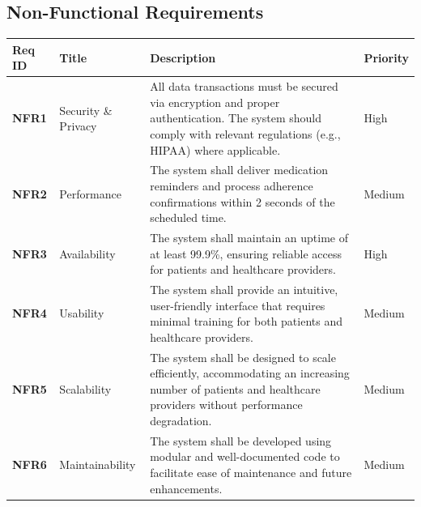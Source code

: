 \documentclass[
  12pt,
]{article}
\begin{document}
\subsection{Non-Functional
Requirements}\label{non-functional-requirements}

\begin{longtable}[]{@{}
  >{\raggedright\arraybackslash}p{}
  >{\raggedright\arraybackslash}p{}
  >{\raggedright\arraybackslash}p{}
  >{\raggedright\arraybackslash}p{}@{}}
\toprule\noalign{}
\begin{minipage}[b]{\linewidth}\raggedright
\textbf{Req ID}
\end{minipage} & \begin{minipage}[b]{\linewidth}\raggedright
\textbf{Title}
\end{minipage} & \begin{minipage}[b]{\linewidth}\raggedright
\textbf{Description}
\end{minipage} & \begin{minipage}[b]{\linewidth}\raggedright
\textbf{Priority}
\end{minipage} \\
\midrule\noalign{}
\endhead
\bottomrule\noalign{}
\endlastfoot
\textbf{NFR1} & Security \& Privacy & All data transactions must be
secured via encryption and proper authentication. The system should
comply with relevant regulations (e.g., HIPAA) where applicable. &
High \\
\textbf{NFR2} & Performance & The system shall deliver medication
reminders and process adherence confirmations within 2 seconds of the
scheduled time. & Medium \\
\textbf{NFR3} & Availability & The system shall maintain an uptime of at
least 99.9\%, ensuring reliable access for patients and healthcare
providers. & High \\
\textbf{NFR4} & Usability & The system shall provide an intuitive,
user-friendly interface that requires minimal training for both patients
and healthcare providers. & Medium \\
\textbf{NFR5} & Scalability & The system shall be designed to scale
efficiently, accommodating an increasing number of patients and
healthcare providers without performance degradation. & Medium \\
\textbf{NFR6} & Maintainability & The system shall be developed using
modular and well-documented code to facilitate ease of maintenance and
future enhancements. & Medium \\
\end{longtable}
\end{document}

